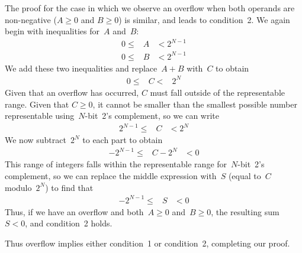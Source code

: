 The proof for the case in which we observe an overflow when 
both operands are non-negative ($A\geq{0}$ and $B\geq{0}$)
is similar, and leads to condition~2.  We again begin with
inequalities for~$A$ and~$B$:
%
\begin{eqnarray*}
0 \leq & A & < 2^{N-1}\\
0 \leq & B & < 2^{N-1}
\end{eqnarray*}
%
We add these two inequalities and replace~$A+B$ with~$C$ to obtain
%
\begin{eqnarray*}
0 \leq & C < & 2^N
\end{eqnarray*}
%
Given that an overflow has occurred, $C$ must fall outside of the 
representable range.  Given that $C\geq{}0$, it cannot be smaller than the
smallest possible number representable using~\mbox{$N$-bit}~2's
complement, so we can write
%
\begin{eqnarray*}
2^{N-1} \leq & C & < 2^N
\end{eqnarray*}
%
We now subtract~$2^N$ to each part to obtain
%
\begin{eqnarray*}
-2^{N-1} \leq & C - 2^N & < 0
\end{eqnarray*}
%
This range of integers falls within the representable range 
for~\mbox{$N$-bit}~2's complement, so we can replace the middle
expression with~$S$ (equal to~$C$ modulo~$2^N$) to find that
%
\begin{eqnarray*}
-2^{N-1} \leq & S & < 0
\end{eqnarray*}
%
Thus, if we have an overflow and both~$A\geq{0}$ and~$B\geq{0}$, the resulting
sum~$S<0$, and condition~2 holds.

Thus overflow implies either condition~1 or condition~2, completing our
proof.

\vfill

\pagebreak

